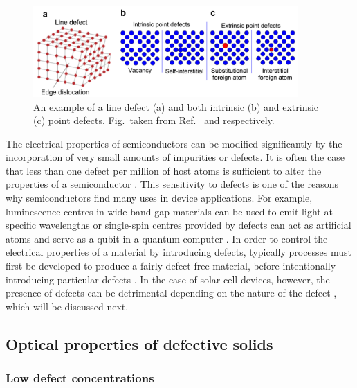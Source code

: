 \documentclass[11pt, twoside]{report}
\begin{document}
\begin{figure}[h!]
  \centering
    \includegraphics[width=0.9\textwidth]{figures/defects.png}
    \caption[An example of a line defect (a) and both intrinsic (b) and extrinsic (c) point defects.]{An example of a line defect (a) and both intrinsic (b) and extrinsic (c) point defects. Fig.~taken from Ref.~ and  respectively.}
  \label{defects}
\end{figure}

The electrical properties of semiconductors can be modified significantly by the incorporation of very small amounts of impurities or defects. It is often the case that less than one defect per million of host atoms is sufficient to alter the properties of a semiconductor \cite{fund_semi}. This sensitivity to defects is one of the reasons why semiconductors find many uses in device applications. For example, luminescence centres in wide-band-gap materials can be used to emit light at specific wavelengths or single-spin centres provided by defects can act as artificial atoms and serve as a qubit in a quantum computer \cite{defects_tutorial}. In order to control the electrical properties of a material by introducing defects, typically processes must first be developed to produce a fairly defect-free material, before intentionally introducing particular defects \cite{fund_semi}. In the case of solar cell devices, however, the presence of defects can be detrimental depending on the nature of the defect \cite{Aron_defect_tolerance}, which will be discussed next. 

\subsection{Optical properties of defective solids}\label{defect_theory}
\subsubsection{Low defect concentrations}
\end{document}
